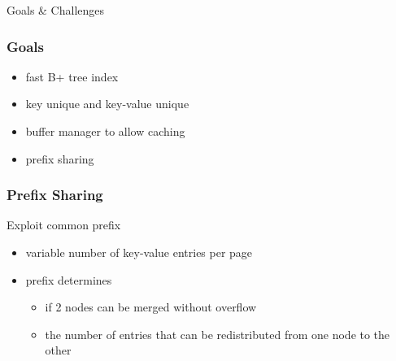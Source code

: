 \documentclass{beamer}
\begin{document}
  \begin{section}{Goals \& Challenges}
    \begin{frame}
      \frametitle{Goals}
        \begin{itemize}
          \item fast B+ tree index
          \item key unique and key-value unique
          \item buffer manager to allow caching
          \item prefix sharing
        \end{itemize}
    \end{frame}

    \begin{frame}
      \frametitle{Prefix Sharing}
      \begin{block} {Exploit common prefix}
      \hspace*{\fill}
      \pause
      \hspace*{\fill}
      \end{block}
      \pause
      \pause
        \begin{itemize}
            \item variable number of key-value entries per page
            \item prefix determines
            \begin{itemize}
                \item if 2 nodes can be merged without overflow
                \item the number of entries that can be redistributed from one node to the other
            \end{itemize}
        \end{itemize}    
    \end{frame}


\end{section}
\end{document}
